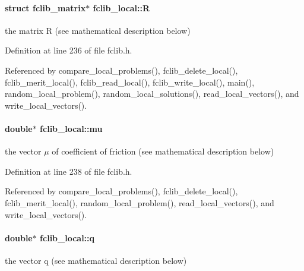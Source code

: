 \paragraph[{R}]{\setlength{\rightskip}{0pt plus 5cm}struct {\bf fclib\+\_\+matrix}$\ast$ fclib\+\_\+local\+::\+R}\label{structfclib__local_ae08751b33a0771d54d48aee48f838ced}


the matrix R (see mathematical description below) 



Definition at line 236 of file fclib.\+h.



Referenced by compare\+\_\+local\+\_\+problems(), fclib\+\_\+delete\+\_\+local(), fclib\+\_\+merit\+\_\+local(), fclib\+\_\+read\+\_\+local(), fclib\+\_\+write\+\_\+local(), main(), random\+\_\+local\+\_\+problem(), random\+\_\+local\+\_\+solutions(), read\+\_\+local\+\_\+vectors(), and write\+\_\+local\+\_\+vectors().

\hypertarget{structfclib__local_a90d9490cac0bc9b69fd13253882f1557}{}
\paragraph[{mu}]{\setlength{\rightskip}{0pt plus 5cm}double$\ast$ fclib\+\_\+local\+::mu}\label{structfclib__local_a90d9490cac0bc9b69fd13253882f1557}


the vector $\mu$ of coefficient of friction (see mathematical description below) 



Definition at line 238 of file fclib.\+h.



Referenced by compare\+\_\+local\+\_\+problems(), fclib\+\_\+delete\+\_\+local(), fclib\+\_\+merit\+\_\+local(), random\+\_\+local\+\_\+problem(), read\+\_\+local\+\_\+vectors(), and write\+\_\+local\+\_\+vectors().

\hypertarget{structfclib__local_a9a032092a828a13a7e106cce4ba7ad96}{}
\paragraph[{q}]{\setlength{\rightskip}{0pt plus 5cm}double$\ast$ fclib\+\_\+local\+::q}\label{structfclib__local_a9a032092a828a13a7e106cce4ba7ad96}


the vector q (see mathematical description below) 



